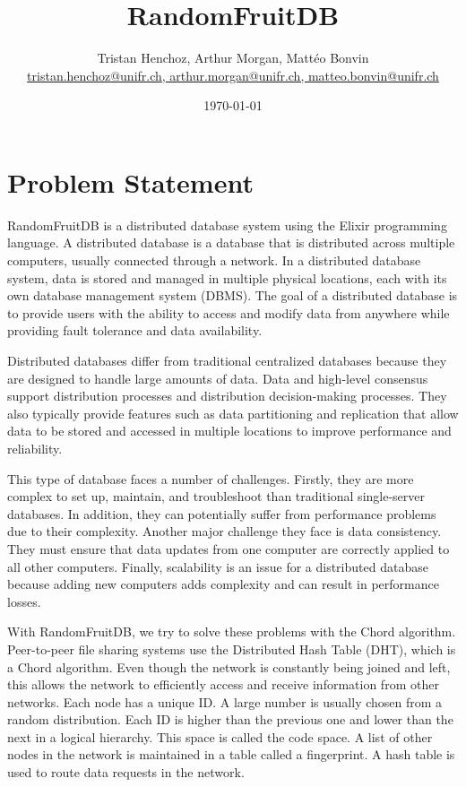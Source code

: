 \documentclass{article}
\newcommand{\mail}[1]{{\href{mailto:#1}{#1}}}
\begin{document}
\title{RandomFruitDB}
\author{Tristan Henchoz, Arthur Morgan, Mattéo Bonvin
	\\ {\small\mail{tristan.henchoz@unifr.ch, arthur.morgan@unifr.ch, matteo.bonvin@unifr.ch}}}
\date{\today}

\maketitle
\tableofcontents
\pagebreak


\section{Problem Statement}

RandomFruitDB is a distributed database system using the Elixir programming language. A distributed database is a database that is distributed across multiple computers, usually connected through a network. In a distributed database system, data is stored and managed in multiple physical locations, each with its own database management system (DBMS). The goal of a distributed database is to provide users with the ability to access and modify data from anywhere while providing fault tolerance and data availability.

Distributed databases differ from traditional centralized databases because they are designed to handle large amounts of data. Data and high-level consensus support distribution processes and distribution decision-making processes. They also typically provide features such as data partitioning and replication that allow data to be stored and accessed in multiple locations to improve performance and reliability.

This type of database faces a number of challenges. Firstly, they are more complex to set up, maintain, and troubleshoot than traditional single-server databases. In addition, they can potentially suffer from performance problems due to their complexity. Another major challenge they face is data consistency. They must ensure that data updates from one computer are correctly applied to all other computers. Finally, scalability is an issue for a distributed database because adding new computers adds complexity and can result in performance losses.

With RandomFruitDB, we try to solve these problems with the Chord algorithm. Peer-to-peer file sharing systems use the Distributed Hash Table (DHT), which is a Chord algorithm. Even though the network is constantly being joined and left, this allows the network to efficiently access and receive information from other networks. Each node has a unique ID. A large number is usually chosen from a random distribution. Each ID is higher than the previous one and lower than the next in a logical hierarchy. This space is called the code space. A list of other nodes in the network is maintained in a table called a fingerprint. A hash table is used to route data requests in the network.
\end{document}
